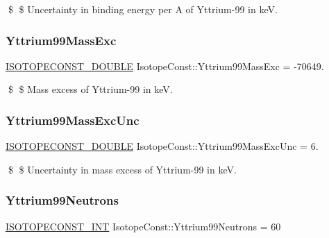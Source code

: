 \$ \$ Uncertainty in binding energy per A of Yttrium-\/99 in keV. \mbox{\label{group___isotope_const-_yttrium-_y99_ga40c9dee9c59330f78166eed23346b194}} 
\subsubsection{\texorpdfstring{Yttrium99\+Mass\+Exc}{Yttrium99MassExc}}
{\footnotesize\ttfamily \mbox{\hyperlink{group___isotope_const-_macros_ga8f45a7272ce02c0b4c65c44636ed719a}{I\+S\+O\+T\+O\+P\+E\+C\+O\+N\+S\+T\+\_\+\+D\+O\+U\+B\+LE}} Isotope\+Const\+::\+Yttrium99\+Mass\+Exc = -\/70649.}

\$ \$ Mass excess of Yttrium-\/99 in keV. \mbox{\label{group___isotope_const-_yttrium-_y99_ga27ef3e7a435e00d8823f429491b48937}} 
\subsubsection{\texorpdfstring{Yttrium99\+Mass\+Exc\+Unc}{Yttrium99MassExcUnc}}
{\footnotesize\ttfamily \mbox{\hyperlink{group___isotope_const-_macros_ga8f45a7272ce02c0b4c65c44636ed719a}{I\+S\+O\+T\+O\+P\+E\+C\+O\+N\+S\+T\+\_\+\+D\+O\+U\+B\+LE}} Isotope\+Const\+::\+Yttrium99\+Mass\+Exc\+Unc = 6.}

\$ \$ Uncertainty in mass excess of Yttrium-\/99 in keV. \mbox{\label{group___isotope_const-_yttrium-_y99_ga1db60c859fce798418a26dc3fbc797d9}} 
\subsubsection{\texorpdfstring{Yttrium99\+Neutrons}{Yttrium99Neutrons}}
{\footnotesize\ttfamily \mbox{\hyperlink{group___isotope_const-_macros_ga5f18360b3e99483a35c32d789e62621c}{I\+S\+O\+T\+O\+P\+E\+C\+O\+N\+S\+T\+\_\+\+I\+NT}} Isotope\+Const\+::\+Yttrium99\+Neutrons = 60}

